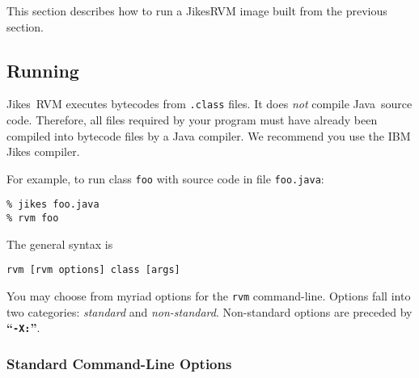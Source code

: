 This section describes how to run a Jikes\trademark RVM  image built
from the previous section. 

\subsection{Running \jrvm}

Jikes\trademark\ RVM executes bytecodes from {\tt .class} files. It does {\em
not} compile 
Java\trademark\ source code. Therefore, all files 
required by your program must have already been compiled into bytecode
files by a Java compiler.  We recommend you use the IBM Jikes compiler.

For example, to run class {\tt foo} with source code in file {\tt foo.java}:
\begin{verbatim}
% jikes foo.java
% rvm foo 
\end{verbatim}

The general syntax is
\begin{verbatim}
rvm [rvm options] class [args]
\end{verbatim}

You may choose from myriad options for the {\tt rvm} command-line.  
Options fall into two categories: {\em standard} and {\em
non-standard}.  Non-standard options are preceded by {\bf ``{\tt -X:}''}.

\subsubsection{Standard Command-Line Options}

